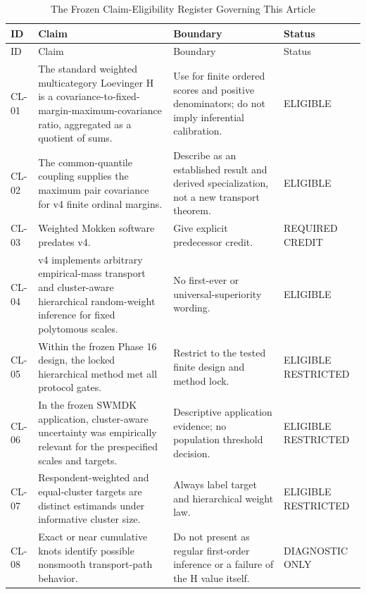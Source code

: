 {\footnotesize
\setlength{\tabcolsep}{4pt}
\begin{longtable}{p{}p{}p{}>{\raggedright\arraybackslash}p{}}
\caption{The Frozen Claim-Eligibility Register Governing This Article}
\label{tab:claims} \\
\toprule
ID & Claim & Boundary & Status \\
\midrule
\endfirsthead
\toprule
ID & Claim & Boundary & Status \\
\midrule
\endhead
CL-01 & The standard weighted multicategory Loevinger H is a covariance-to-fixed-margin-maximum-covariance ratio, aggregated as a quotient of sums. & Use for finite ordered scores and positive denominators; do not imply inferential calibration. & ELIGIBLE \\[2pt]
CL-02 & The common-quantile coupling supplies the maximum pair covariance for v4 finite ordinal margins. & Describe as an established result and derived specialization, not a new transport theorem. & ELIGIBLE \\[2pt]
CL-03 & Weighted Mokken software predates v4. & Give explicit predecessor credit. & REQUIRED CREDIT \\[2pt]
CL-04 & v4 implements arbitrary empirical-mass transport and cluster-aware hierarchical random-weight inference for fixed polytomous scales. & No first-ever or universal-superiority wording. & ELIGIBLE \\[2pt]
CL-05 & Within the frozen Phase 16 design, the locked hierarchical method met all protocol gates. & Restrict to the tested finite design and method lock. & ELIGIBLE RESTRICTED \\[2pt]
CL-06 & In the frozen SWMDK application, cluster-aware uncertainty was empirically relevant for the prespecified scales and targets. & Descriptive application evidence; no population threshold decision. & ELIGIBLE RESTRICTED \\[2pt]
CL-07 & Respondent-weighted and equal-cluster targets are distinct estimands under informative cluster size. & Always label target and hierarchical weight law. & ELIGIBLE RESTRICTED \\[2pt]
CL-08 & Exact or near cumulative knots identify possible nonsmooth transport-path behavior. & Do not present as regular first-order inference or a failure of the H value itself. & DIAGNOSTIC ONLY \\[2pt]

\end{longtable}}
